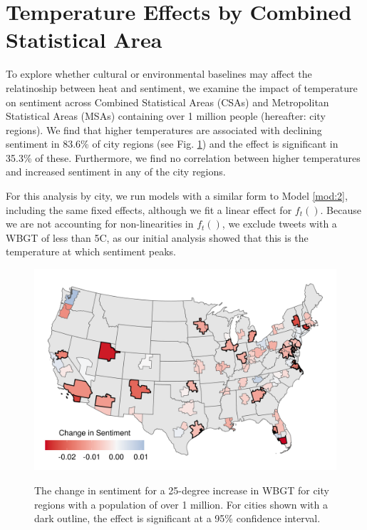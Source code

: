 \documentclass{article}
\begin{document}
\section*{Temperature Effects by Combined Statistical Area}
To explore whether cultural or environmental baselines may affect the relatinoship between heat and sentiment, we examine the impact of temperature on sentiment across Combined Statistical Areas (CSAs) and Metropolitan Statistical Areas (MSAs) containing over 1 million people (hereafter: city regions). We find that higher temperatures are associated with declining sentiment in 83.6\% of city regions (see Fig. \ref{fig:map}) and the effect is significant in 35.3\% of these. Furthermore, we find no correlation between higher temperatures and increased sentiment in any of the city regions.

For this analysis by city, we run models with a similar form to Model \ref{mod:2}, including the same fixed effects, although we fit a linear effect for $f_t()$.  Because we are not accounting for non-linearities in $f_t()$, we exclude tweets with a WBGT of less than 5\textdegree C, as our initial analysis showed that this is the temperature at which sentiment peaks.

\begin{figure}[H]
\centering
  \includegraphics[width=\linewidth]{../res/map_wbgt.png}
  \label{fig:map}
    \caption{The change in sentiment for a 25-degree increase in WBGT for city regions with a population of over 1 million.  For cities shown with a dark outline, the effect is significant at a 95\% confidence interval.}
\end{figure}
\end{document}

